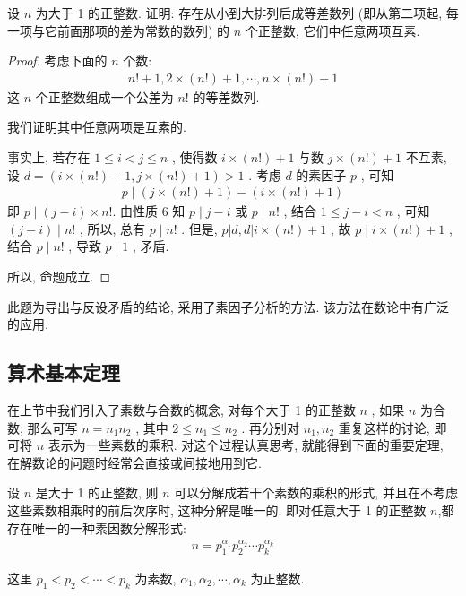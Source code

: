 \begin{example}
	设 $n$ 为大于 1 的正整数. 证明: 存在从小到大排列后成等差数列 (即从第二项起, 每一项与它前面那项的差为常数的数列) 的 $n$ 个正整数, 它们中任意两项互素.
\end{example}
\begin{proof}
	考虑下面的 $n$ 个数:
\begin{align*}
	n!+1,2 \times(n!)+1, \cdots, n \times(n!)+1
\end{align*}
这 $n$ 个正整数组成一个公差为 $n!$ 的等差数列.

我们证明其中任意两项是互素的. 

事实上, 若存在 $1 \leqslant i<j \leqslant n$ , 使得数 $i \times(n!)+1$ 与数 $j \times(n!)+1$ 不互素, 设 $d=(i \times(n!)+1, j \times(n!)+1)>1$ . 考虑 $d$ 的素因子 $p$ , 可知
\begin{align*}
	p \mid(j \times(n!)+1)-(i \times(n!)+1)
\end{align*}
即 $p \mid(j-i) \times n!$. 由性质 6 知 $p \mid j-i$ 或 $p \mid n!$ , 结合 $1 \leqslant j-i<n$ , 可知 $(j-i) \mid n!$ , 所以, 总有 $p \mid n!$ . 但是,  $p|d, d| i \times(n!)+1$ , 故 $p \mid i \times(n!)+1$ , 结合 $p \mid n!$ , 导致 $p \mid 1$ , 矛盾.

所以, 命题成立.
\end{proof}
\begin{note}
	此题为导出与反设矛盾的结论, 采用了素因子分析的方法. 该方法在数论中有广泛的应用.
\end{note}

\subsection{算术基本定理}
在上节中我们引入了素数与合数的概念, 对每个大于 1 的正整数 $n$ , 如果 $n$ 为合数, 那么可写 $n=n_{1} n_{2}$ , 其中 $2 \leqslant n_{1} \leqslant n_{2}$ . 再分别对 $n_{1} ,  n_{2}$ 重复这样的讨论, 即可将 $n$ 表示为一些素数的乘积. 对这个过程认真思考, 就能得到下面的重要定理, 在解数论的问题时经常会直接或间接地用到它.
\begin{theorem}[算术基本定理]
	 设 $n$ 是大于 1 的正整数, 则 $n$ 可以分解成若干个素数的乘积的形式, 并且在不考虑这些素数相乘时的前后次序时, 这种分解是唯一的. 即对任意大于 1 的正整数 $n$,都存在唯一的一种素因数分解形式:
\begin{align*}
	n=p_{1}^{\alpha_{1}} p_{2}^{\alpha_{2}} \cdots p_{k}^{\alpha_{k}}
\end{align*}

这里 $p_{1}<p_{2}<\cdots<p_{k}$ 为素数,  $\alpha_{1}, \alpha_{2}, \cdots, \alpha_{k}$ 为正整数.
\end{theorem}

